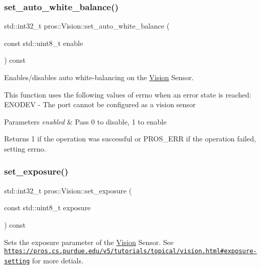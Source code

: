 \subsubsection{\texorpdfstring{set\+\_\+auto\+\_\+white\+\_\+balance()}{set\_auto\_white\_balance()}}
{\footnotesize\ttfamily std\+::int32\+\_\+t pros\+::\+Vision\+::set\+\_\+auto\+\_\+white\+\_\+balance (\begin{DoxyParamCaption}\item[{const std\+::uint8\+\_\+t}]{enable }\end{DoxyParamCaption}) const}

Enables/disables auto white-\/balancing on the \hyperlink{classpros_1_1Vision}{Vision} Sensor.

This function uses the following values of errno when an error state is reached\+: E\+N\+O\+D\+EV -\/ The port cannot be configured as a vision sensor


\begin{DoxyParams}{Parameters}
{\em enabled} & Pass 0 to disable, 1 to enable\\
\hline
\end{DoxyParams}
\begin{DoxyReturn}{Returns}
1 if the operation was successful or P\+R\+O\+S\+\_\+\+E\+RR if the operation failed, setting errno. 
\end{DoxyReturn}
\mbox{\label{classpros_1_1Vision_a2ad6faaad1abb936f52022022611ac7f}} 
\subsubsection{\texorpdfstring{set\+\_\+exposure()}{set\_exposure()}}
{\footnotesize\ttfamily std\+::int32\+\_\+t pros\+::\+Vision\+::set\+\_\+exposure (\begin{DoxyParamCaption}\item[{const std\+::uint8\+\_\+t}]{exposure }\end{DoxyParamCaption}) const}

Sets the exposure parameter of the \hyperlink{classpros_1_1Vision}{Vision} Sensor. See \href{https://pros.cs.purdue.edu/v5/tutorials/topical/vision.html#exposure-setting}{\tt https\+://pros.\+cs.\+purdue.\+edu/v5/tutorials/topical/vision.\+html\#exposure-\/setting} for more detials.

